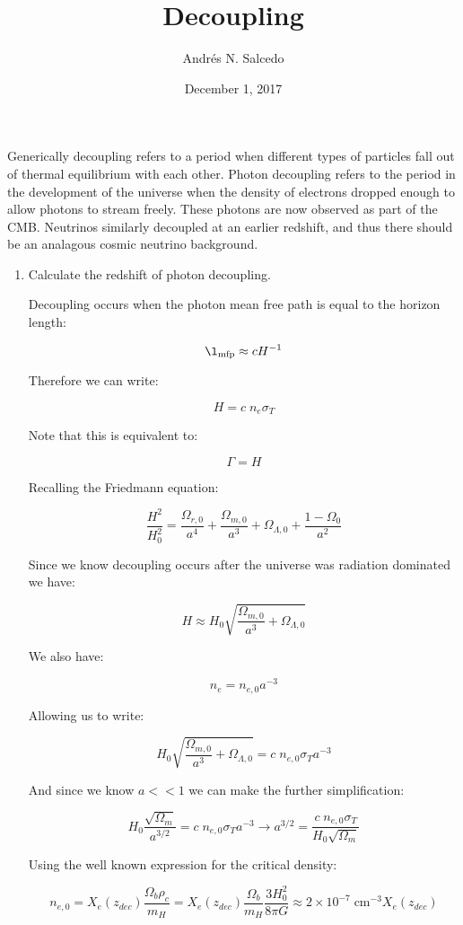 \documentclass[12pt, letterpaper]{article}
\title{Decoupling}
\author{Andr\'{e}s N. Salcedo}
\date{December 1, 2017}
\begin{document}
\maketitle

Generically decoupling refers to a period when different types of particles fall out of thermal equilibrium with each other. Photon decoupling refers to the period in the development of the universe when the density of electrons dropped enough to allow photons to stream freely. These photons are now observed as part of the CMB.  Neutrinos similarly decoupled at an earlier redshift, and thus there should be an analagous cosmic neutrino background.

\begin{enumerate}

\item Calculate the redshift of photon decoupling.

Decoupling occurs when the photon mean free path is equal to the horizon length:

$$\l_{\mathrm{mfp}} \approx c H^{-1}$$

Therefore we can write:

$$H = c\; n_e \sigma_T$$

Note that this is equivalent to:

$$\Gamma = H$$

Recalling the Friedmann equation:

$$\frac{H^2}{H_0^2} = \frac{\Omega_{r,0}}{a^4} + \frac{\Omega_{m,0}}{a^3} + \Omega_{\Lambda,0} + \frac{1 - \Omega_0}{a^2}$$

Since we know decoupling occurs after the universe was radiation dominated we have:

$$H \approx H_0 \sqrt{\frac{\Omega_{m,0}}{a^3} + \Omega_{\Lambda,0}}$$

We also have:

$$n_e = n_{e,0} a^{-3}$$

Allowing us to write:

$$H_0 \sqrt{\frac{\Omega_{m,0}}{a^3} + \Omega_{\Lambda,0}} = c \; n_{e,0} \sigma_T a^{-3}$$

And since we know $a << 1$ we can make the further simplification:

$$H_0 \frac{\sqrt{\Omega_m}}{a^{3/2}} = c \; n_{e,0} \sigma_T a^{-3} \rightarrow a^{3/2} = \frac{c \; n_{e,0} \sigma_T}{ H_0 \sqrt{\Omega_m}} $$

Using the well known expression for the critical density:

$$n_{e,0} = X_e(z_{dec}) \frac{\Omega_b \rho_c}{m_H} = X_e(z_{dec})\frac{\Omega_b}{m_H} \frac{3 H_0^2}{8 \pi G} \approx 2 \times 10^{-7} \; \mathrm{cm}^{-3} X_e(z_{dec})$$


\end{enumerate}
\end{document}
